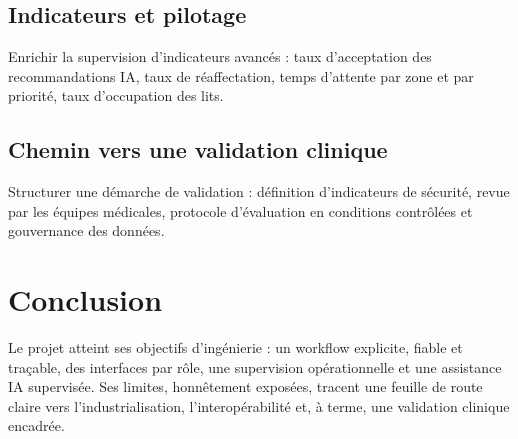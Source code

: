 \subsection{Indicateurs et pilotage}

Enrichir la supervision d'indicateurs avancés : taux d'acceptation des recommandations IA, taux de réaffectation, temps d'attente par zone et par priorité, taux d'occupation des lits.

\subsection{Chemin vers une validation clinique}

Structurer une démarche de validation : définition d'indicateurs de sécurité, revue par les équipes médicales, protocole d'évaluation en conditions contrôlées et gouvernance des données.

\section{Conclusion}

Le projet atteint ses objectifs d'ingénierie : un workflow explicite, fiable et traçable, des interfaces par rôle, une supervision opérationnelle et une assistance IA supervisée. Ses limites, honnêtement exposées, tracent une feuille de route claire vers l'industrialisation, l'interopérabilité et, à terme, une validation clinique encadrée.
